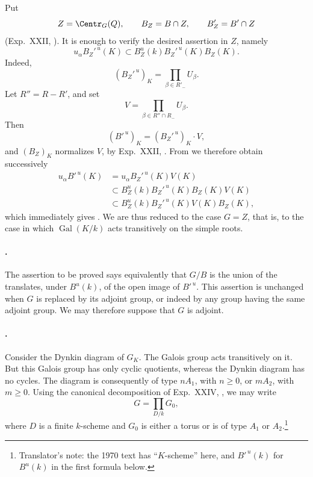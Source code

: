 Put
\[
 Z=\Centr_G(Q),\qquad B_Z=B\cap Z,\qquad B'_Z=B'\cap Z
\]
\textup{(Exp.\ XXII, )}.  It is enough to verify the desired
assertion in \(Z\), namely
\[
 u_\alpha B_Z'^{\,u}(K)
 \subset B_Z^u(k)B_Z'^{\,u}(K)B_Z(K).                 \tag{2}\label{sga3:xxvi:theorem:5-1:equation:2}
\]
Indeed,
\[
 (B_Z'^{\,u})_K=\prod_{\beta\in R'_-}U_\beta.
\]
Let \(R''=R-R'\), and set
\[
 V=\prod_{\beta\in R''\cap R_-}U_\beta.
\]
Then
\[
 (B'^{\,u})_K=(B_Z'^{\,u})_K\cdot V,
\]
and \((B_Z)_K\) normalizes \(V\), by Exp.\ XXII, .  From
\textup{} we therefore obtain successively
\[
\begin{aligned}
 u_\alpha B'^{\,u}(K)
 &=u_\alpha B_Z'^{\,u}(K)V(K)\\
 &\subset B_Z^u(k)B_Z'^{\,u}(K)B_Z(K)V(K)\\
 &\subset B_Z^u(k)B_Z'^{\,u}(K)V(K)B_Z(K),
\end{aligned}
\]
which immediately gives \textup{}.  We are thus reduced to the case
\(G=Z\), that is, to the case in which
\(\operatorname{Gal}(K/k)\) acts transitively on the simple roots.

\paragraph{.}
The assertion to be proved says equivalently that \(G/B\) is the
union of the translates, under \(B^u(k)\), of the open image of
\(B'^{\,u}\).  This assertion is unchanged when \(G\) is replaced by
its adjoint group, or indeed by any group having the same adjoint
group.  We may therefore suppose that \(G\) is adjoint.

\paragraph{.}
Consider the Dynkin diagram of \(G_K\).  The Galois group acts
transitively on it.  But this Galois group has only cyclic quotients,
whereas the Dynkin diagram has no cycles.  The diagram is consequently
of type \(nA_1\), with \(n\geq0\), or \(mA_2\), with \(m\geq0\).
Using the canonical decomposition of Exp.\ XXIV, , we may write
\[
 G=\prod_{D/k}G_0,
\]
where \(D\) is a finite \(k\)-scheme and \(G_0\) is either a torus or
is of type \(A_1\) or \(A_2\).\footnote{Translator's note: the 1970 text has ``\(K\)-scheme'' here, and
\(B'^{\,u}(k)\) for \(B^u(k)\) in the first formula below.}

